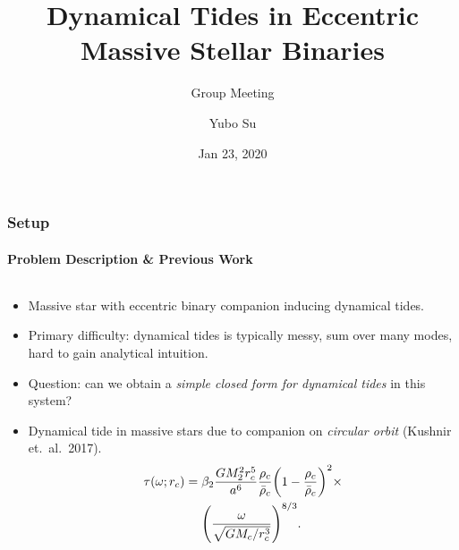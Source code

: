\documentclass[dvipsnames,8pt]{beamer}
\DeclarePairedDelimiter\p{\lparen}{\rparen}
\begin{document}
\title{Dynamical Tides in Eccentric Massive Stellar Binaries}
\subtitle{Group Meeting}
\author{Yubo Su}
\date{Jan 23, 2020}

\maketitle

\begin{frame}
    \frametitle{Setup}
    \framesubtitle{Problem Description \& Previous Work}

    \begin{columns}
        \begin{column}{0.5\textwidth}
            \begin{itemize}
                \item Massive star with eccentric binary companion inducing dynamical
                    tides.

                \item Primary difficulty: dynamical tides is typically messy, sum over
                    many modes, hard to gain analytical intuition.

                \item Question: can we obtain a \emph{simple closed form for dynamical
                    tides} in this system?

                \item Dynamical tide in massive stars due to companion on \emph{circular
                    orbit} (Kushnir et.\ al.\ 2017).
                    \begin{align*}
                        \tau(\omega; r_c) ={}& \beta_2\frac{GM_2^2r_c^5}{a^6}
                                \frac{\rho_c}{\bar{\rho}_c} \p*{1 -
                                \frac{\rho_c}{\bar{\rho}_c}}^2\times\\
                            &\p*{\frac{\omega}{\sqrt{GM_c/r_c^3}}}^{8/3}.
                    \end{align*}


\end{itemize}
\end{column}
\end{columns}
\end{frame}
\end{document}

